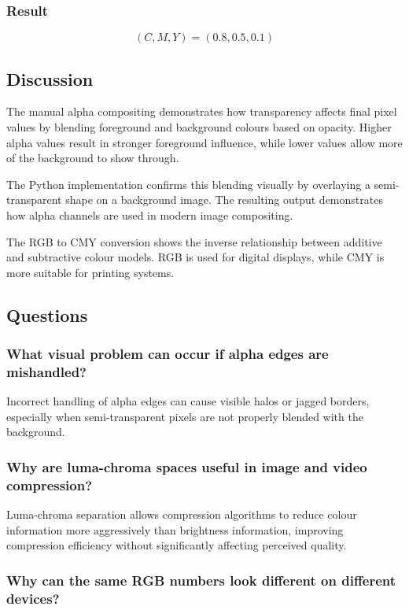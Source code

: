 \documentclass[12pt,a4paper]{article}
\begin{document}
\subsubsection{Result}

\[
(C, M, Y) = (0.8, 0.5, 0.1)
\]

\subsection{Discussion}

The manual alpha compositing demonstrates how transparency affects final pixel values by blending foreground and background colours based on opacity. Higher alpha values result in stronger foreground influence, while lower values allow more of the background to show through.

The Python implementation confirms this blending visually by overlaying a semi-transparent shape on a background image. The resulting output demonstrates how alpha channels are used in modern image compositing.

The RGB to CMY conversion shows the inverse relationship between additive and subtractive colour models. RGB is used for digital displays, while CMY is more suitable for printing systems.

\subsection{Questions}

\subsubsection{What visual problem can occur if alpha edges are mishandled?}

Incorrect handling of alpha edges can cause visible halos or jagged borders, especially when semi-transparent pixels are not properly blended with the background.

\subsubsection{Why are luma-chroma spaces useful in image and video compression?}

Luma-chroma separation allows compression algorithms to reduce colour information more aggressively than brightness information, improving compression efficiency without significantly affecting perceived quality.

\subsubsection{Why can the same RGB numbers look different on different devices?}
\end{document}
